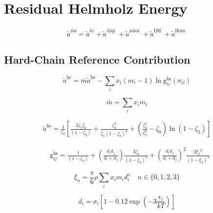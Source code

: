 \documentclass[12pt, letterpaper]{article}
\begin{document}
\section{Residual Helmholz Energy}

\begin{align}
    \tilde{a}^{\mathrm{res}}=\tilde{a}^{h c}+\tilde{a}^{\text {disp }}+\tilde{a}^{\text {assoc }}+\tilde{a}^{\text {DH }}+\tilde{a}^{\text {Born }}
\end{align}

\subsection{Hard-Chain Reference Contribution}

\cite{Gross2001}

\begin{equation}
\tilde{a}^{\mathrm{hc}}=\bar{m} \tilde{a}^{\mathrm{hs}}-\sum_i x_i\left(m_i-1\right) \ln \mathrm{g}_{i i}^{\mathrm{hs}}\left(\sigma_{i i}\right)
\end{equation}

\begin{equation}
    \bar{m}=\sum_i x_i m_i
\end{equation}

\begin{equation}
\begin{aligned}
\tilde{a}^{\mathrm{hs}} =\frac{1}{\zeta_0}\left[\frac{3 \zeta_1 \zeta_2}{\left(1-\zeta_3\right)}+\frac{\zeta_2^3}{\zeta_3\left(1-\zeta_3\right)^2}+\left(\frac{\zeta_2^3}{\zeta_3^2}-\zeta_0\right) \ln \left(1-\zeta_3\right)\right]
\end{aligned}
\end{equation}

\begin{equation}
\begin{aligned}
& \mathrm{g}_{i j}^{\mathrm{hs}}=\frac{1}{\left(1-\zeta_3\right)}+\left(\frac{d_i d_j}{d_i+d_j}\right) \frac{3 \zeta_2}{\left(1-\zeta_3\right)^2} + \left(\frac{d_i d_j}{d_i+d_j}\right)^2 \frac{2 \xi_2{ }^2}{\left(1-\xi_3\right)^3}
\end{aligned}
\end{equation}

\begin{equation}
\xi_n=\frac{\pi}{6} \rho \sum_i x_i m_i d_i^n \quad n \in\{0,1,2,3\}
\end{equation}

\begin{equation}
d_i=\sigma_i\left[1-0.12 \exp \left(-3 \frac{\epsilon_i}{k T}\right)\right]
\end{equation}
\end{document}
